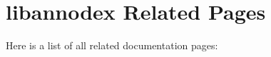 \section{libannodex Related Pages}
Here is a list of all related documentation pages:\begin{CompactList}
\item {}

\end{CompactList}
